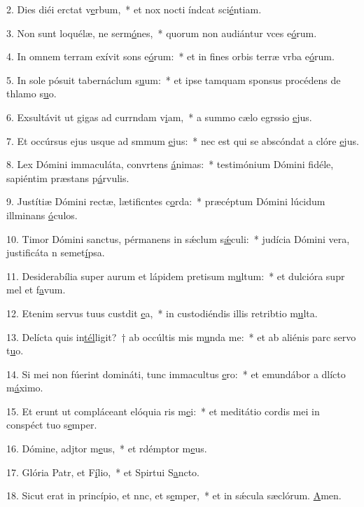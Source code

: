 2. Dies diéi erctat v\uline{e}rbum,~* et nox nocti índcat sci\uline{é}ntiam.\par 
3. Non sunt loquélæ, ne serm\uline{ó}nes,~* quorum non audiántur vces e\uline{ó}rum.\par 
4. In omnem terram exívit sons e\uline{ó}rum:~* et in fines orbis terræ vrba e\uline{ó}rum.\par 
5. In sole pósuit tabernáclum s\uline{u}um:~* et ipse tamquam sponsus procédens de thlamo s\uline{u}o.\par 
6. Exsultávit ut gigas ad currndam v\uline{i}am,~* a summo cælo egrssio \uline{e}jus.\par 
7. Et occúrsus ejus usque ad smmum \uline{e}jus:~* nec est qui se abscóndat a clóre \uline{e}jus.\par 
8. Lex Dómini immaculáta, convrtens \uline{á}nimas:~* testimónium Dómini fidéle, sapiéntim præstans p\uline{á}rvulis.\par 
9. Justítiæ Dómini rectæ, lætificntes c\uline{o}rda:~* præcéptum Dómini lúcidum illminans \uline{ó}culos.\par 
10. Timor Dómini sanctus, pérmanens in sǽclum s\uline{ǽ}culi:~* judícia Dómini vera, justificáta n semet\uline{í}psa.\par 
11. Desiderabília super aurum et lápidem pretisum m\uline{u}ltum:~* et dulcióra supr mel et f\uline{a}vum.\par 
12. Etenim servus tuus custdit \uline{e}a,~* in custodiéndis illis retribtio m\uline{u}lta.\par 
13. Delícta quis in\uline{tél}ligit?~† ab occúltis mis m\uline{u}nda me:~* et ab aliénis parc servo t\uline{u}o.\par 
14. Si mei non fúerint domináti, tunc immacultus \uline{e}ro:~* et emundábor a dlícto m\uline{á}ximo.\par 
15. Et erunt ut compláceant elóquia ris m\uline{e}i:~* et meditátio cordis mei in conspéct tuo s\uline{e}mper.\par 
16. Dómine, adjtor m\uline{e}us,~* et rdémptor m\uline{e}us.\par 
17. Glória Patr, et F\uline{í}lio,~* et Spirtui S\uline{a}ncto.\par 
18. Sicut erat in princípio, et nnc, et s\uline{e}mper,~* et in sǽcula sæclórum. \uline{A}men.\par 

